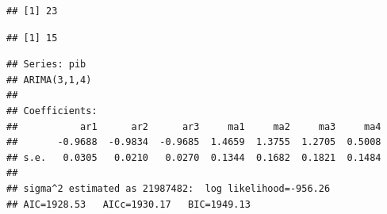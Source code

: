 \documentclass[11pt, a4paper]{report}
\newenvironment{Shaded}{\begin{snugshade}}{\end{snugshade}}
\newcommand{\DecValTok}[1]{\textcolor[rgb]{0.00,0.00,0.81}{#1}}
\newcommand{\KeywordTok}[1]{\textcolor[rgb]{0.13,0.29,0.53}{\textbf{#1}}}
\newcommand{\NormalTok}[1]{#1}
\newcommand{\OperatorTok}[1]{\textcolor[rgb]{0.81,0.36,0.00}{\textbf{#1}}}
\newcommand{\StringTok}[1]{\textcolor[rgb]{0.31,0.60,0.02}{#1}}
\theoremstyle{plain}
\theoremstyle{plain}
\theoremstyle{remark}
\begin{document}
\begin{Shaded}
\end{Shaded}

\begin{verbatim}
## [1] 23
\end{verbatim}

\begin{Shaded}
\end{Shaded}

\begin{verbatim}
## [1] 15
\end{verbatim}

\begin{Shaded}
\end{Shaded}

\begin{verbatim}
## Series: pib 
## ARIMA(3,1,4) 
## 
## Coefficients:
##           ar1      ar2      ar3     ma1     ma2     ma3     ma4
##       -0.9688  -0.9834  -0.9685  1.4659  1.3755  1.2705  0.5008
## s.e.   0.0305   0.0210   0.0270  0.1344  0.1682  0.1821  0.1484
## 
## sigma^2 estimated as 21987482:  log likelihood=-956.26
## AIC=1928.53   AICc=1930.17   BIC=1949.13
\end{verbatim}
\end{document}
